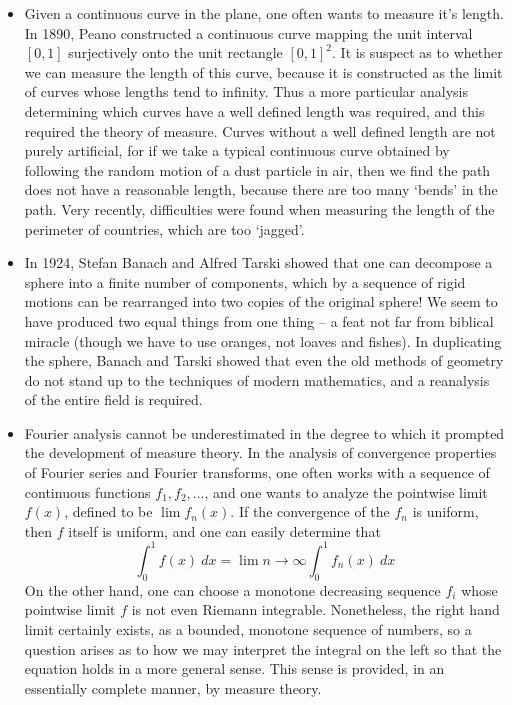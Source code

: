 \begin{itemize}
  \item Given a continuous curve in the plane, one often wants to measure it's length. In 1890, Peano constructed a continuous curve mapping the unit interval $[0,1]$ surjectively onto the unit rectangle $[0,1]^2$. It is suspect as to whether we can measure the length of this curve, because it is constructed as the limit of curves whose lengths tend to infinity. Thus a more particular analysis determining which curves have a well defined length was required, and this required the theory of measure. Curves without a well defined length are not purely artificial, for if we take a typical continuous curve obtained by following the random motion of a dust particle in air, then we find the path does not have a reasonable length, because there are too many `bends' in the path. Very recently, difficulties were found when measuring the length of the perimeter of countries, which are too `jagged'.

  \item In 1924, Stefan Banach and Alfred Tarski showed that one can decompose a sphere into a finite number of components, which by a sequence of rigid motions can be rearranged into two copies of the original sphere! We seem to have produced two equal things from one thing -- a feat not far from biblical miracle (though we have to use oranges, not loaves and fishes). In duplicating the sphere, Banach and Tarski showed that even the old methods of geometry do not stand up to the techniques of modern mathematics, and a reanalysis of the entire field is required.

  \item Fourier analysis cannot be underestimated in the degree to which it prompted the development of measure theory. In the analysis of convergence properties of Fourier series and Fourier transforms, one often works with a sequence of continuous functions $f_1, f_2, \dots$, and one wants to analyze the pointwise limit $f(x)$, defined to be $\lim f_n(x)$. If the convergence of the $f_n$ is uniform, then $f$ itself is uniform, and one can easily determine that
  \[ \int_0^1 f(x)\ dx = \lim{n \to \infty} \int_0^1 f_n(x)\ dx \]
  On the other hand, one can choose a monotone decreasing sequence $f_i$ whose pointwise limit $f$ is not even Riemann integrable. Nonetheless, the right hand limit certainly exists, as a bounded, monotone sequence of numbers, so a question arises as to how we may interpret the integral on the left so that the equation holds in a more general sense. This sense is provided, in an essentially complete manner, by measure theory.
\end{itemize}
